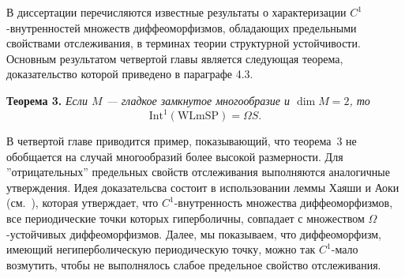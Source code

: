 \documentclass[12pt]{article}
\begin{document}
{В диссертации перечисляются известные результаты о ха\-рак\-те\-ризации $C^1$-внутренностей множеств диффеоморфизмов, обладающих предельными свойствами отслеживания, в тер\-ми\-нах теории структурной устойчивости. %
Основным результатом четвертой главы является следующая тео\-рема, доказательство которой приведено в параграфе 4.3.

\textbf{Теорема 3.} \textit{Если $M$ --- гладкое замкнутое многообразие и $\dim M=2$, то} 
$$\mbox{Int}^1(\mbox{WLmSP})=\Omega S.$$

В четвертой главе приводится пример, показывающий, что теорема~3 не обобщается на слу\-чай многообразий более высокой размерности.
Для ''отрицатель\-ных'' пре\-дельных свойств отслеживания выполняются аналогичные утвер\-ж\-де\-ния. Идея доказательсва состоит в использовании леммы Хаяши и Аоки (см.~\cite{H,A}), которая утверждает, что $C^1$-внутренность множества диф\-фео\-морфизмов, все периодические точки которых гиперболичны, совпадает с множеством $\Omega$-устойчивых диффеоморфизмов. Далее, мы показываем, что диффеоморфизм, имеющий негиперболическую периодическую точку, можно так $C^1$-мало возмутить, чтобы не выполнялось слабое предельное свойство отслеживания.

\makeatletter
\renewcommand{\@biblabel}[1]{#1.\hfill}

\renewcommand{\refname}{Список цитируемой литературы}

}
\end{document}
